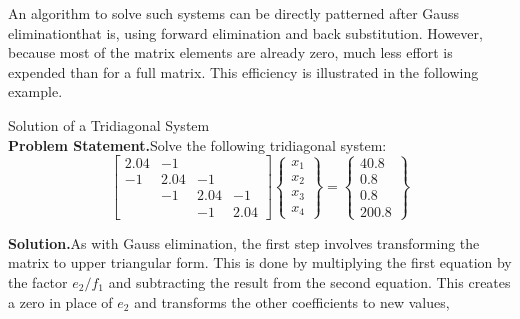 \documentclass[../main.tex]{subfiles}
\begin{document}
An algorithm to solve such systems can be directly patterned after Gauss eliminationthat is, using forward elimination and back substitution. However, because most of the matrix elements are already zero, much less effort is expended than for a full matrix. This efficiency is illustrated in the following example.

\begin{example} Solution of a Tridiagonal System\\

    \noindent\textbf{Problem Statement.}\quad Solve the following tridiagonal system:\\

    $$
    \left[\begin{array}{cccc}
    2.04 & -1 & & \\
    -1 & 2.04 & -1 & \\
    & -1 & 2.04 & -1 \\
    & & -1 & 2.04
    \end{array}\right]\left\{\begin{array}{l}
    x_{1} \\
    x_{2} \\
    x_{3} \\
    x_{4}
    \end{array}\right\}=\left\{\begin{array}{c}
    40.8 \\
    0.8 \\
    0.8 \\
    200.8
    \end{array}\right\}
    $$

    \noindent\textbf{Solution.}\quad As with Gauss elimination, the first step involves transforming the matrix to upper triangular form. This is done by multiplying the first equation by the factor $e_{2} / f_{1}$ and subtracting the result from the second equation. This creates a zero in place of $e_{2}$ and transforms the other coefficients to new values,\\


\end{example}
\end{document}
